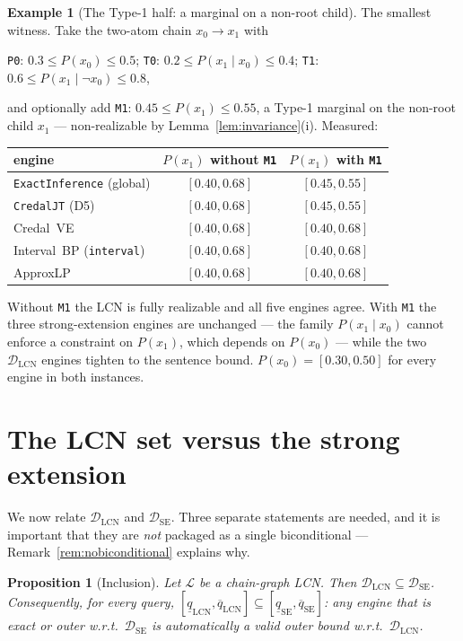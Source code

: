\documentclass[11pt]{article}
\newtheorem{proposition}{Proposition}
\theoremstyle{definition}
\newtheorem{example}{Example}
\newcommand{\lo}{\underline}
\newcommand{\hi}{\overline}
\newcommand{\DSE}{\mathcal{D}_{\mathrm{SE}}}
\newcommand{\DLCN}{\mathcal{D}_{\mathrm{LCN}}}
\begin{document}
\begin{example}[The Type-1 half: a marginal on a non-root child]\label{ex:2node}
The smallest witness. Take the two-atom chain $x_0\to x_1$ with
\begin{center}\small
\texttt{P0}: $0.3\le P(x_0)\le0.5$;\quad
\texttt{T0}: $0.2\le P(x_1\mid x_0)\le0.4$;\quad
\texttt{T1}: $0.6\le P(x_1\mid\lnot x_0)\le0.8$,
\end{center}
and optionally add \texttt{M1}: $0.45\le P(x_1)\le0.55$, a Type-1 marginal on the non-root child
$x_1$ --- non-realizable by Lemma~\ref{lem:invariance}(i). Measured:
\begin{center}\small
\begin{tabular}{@{}lcc@{}}
\toprule
engine & $P(x_1)$ without \texttt{M1} & $P(x_1)$ with \texttt{M1} \\
\midrule
\texttt{ExactInference} (global) & $[0.40,0.68]$ & $\mathbf{[0.45,0.55]}$ \\
\texttt{CredalJT} (D5)           & $[0.40,0.68]$ & $\mathbf{[0.45,0.55]}$ \\
Credal~VE                        & $[0.40,0.68]$ & $[0.40,0.68]$ \\
Interval~BP (\texttt{interval})  & $[0.40,0.68]$ & $[0.40,0.68]$ \\
ApproxLP                         & $[0.40,0.68]$ & $[0.40,0.68]$ \\
\bottomrule
\end{tabular}
\end{center}
Without \texttt{M1} the LCN is fully realizable and all five engines agree. With \texttt{M1} the
three strong-extension engines are unchanged --- the family $P(x_1\mid x_0)$ cannot enforce a
constraint on $P(x_1)$, which depends on $P(x_0)$ --- while the two $\DLCN$ engines tighten to the
sentence bound. $P(x_0)=[0.30,0.50]$ for every engine in both instances.
\end{example}

\section{The LCN set versus the strong extension}\label{sec:incl}

We now relate $\DLCN$ and $\DSE$. Three separate statements are needed, and it is important that they
are \emph{not} packaged as a single biconditional --- Remark~\ref{rem:nobiconditional} explains why.

\begin{proposition}[Inclusion]\label{prop:incl}
Let $\mathcal L$ be a chain-graph LCN. Then $\DLCN\subseteq\DSE$. Consequently, for every query,
$[\lo q_{\mathrm{LCN}},\hi q_{\mathrm{LCN}}]\subseteq[\lo q_{\mathrm{SE}},\hi q_{\mathrm{SE}}]$: any
engine that is exact or outer w.r.t.\ $\DSE$ is automatically a valid \emph{outer} bound w.r.t.\
$\DLCN$.
\end{proposition}
\end{document}
